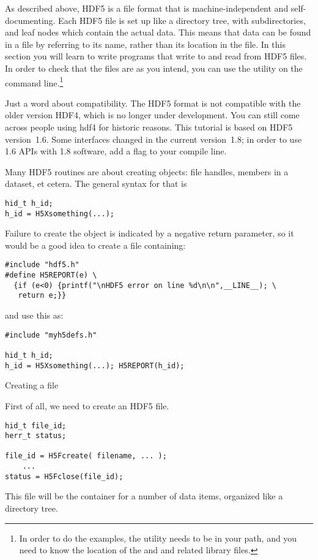 As described above, HDF5 is a file format that is machine-independent
and self-documenting. Each HDF5 file is set up like a directory tree,
with subdirectories, and leaf nodes which contain the actual
data. This means that data can be found in a file by referring to its
name, rather than its location in the file. In this section you will
learn to write programs that write to and read from HDF5 files. In
order to check that the files are as you intend, you can use the
 utility on the command line.\footnote{In order to do the
  examples, the  utility needs to be in your path, and you
  need to know the location of the  and  and
  related library files.}

Just a word about compatibility. The HDF5 format is not compatible
with the older version HDF4, which is no longer under development. You
can still come across people using hdf4 for historic reasons. This
tutorial is based on HDF5 version~1.6. Some interfaces changed in the
current version~1.8; in order to use 1.6 APIs with 1.8 software, add a
flag  to your compile line.

Many HDF5 routines are about creating objects: file handles, members
in a dataset, et cetera. The general syntax for that is
\begin{verbatim}
hid_t h_id;
h_id = H5Xsomething(...);
\end{verbatim}
Failure to create the object is indicated by a negative return
parameter, so it would be a good idea to create a file
  containing:
\begin{verbatim}
#include "hdf5.h"
#define H5REPORT(e) \
  {if (e<0) {printf("\nHDF5 error on line %d\n\n",__LINE__); \
   return e;}}
\end{verbatim}
and use this as:
\begin{verbatim}
#include "myh5defs.h"

hid_t h_id;
h_id = H5Xsomething(...); H5REPORT(h_id);
\end{verbatim}

 {Creating a file}

First of all, we need to create an HDF5 file.
\begin{verbatim}
hid_t file_id;
herr_t status;

file_id = H5Fcreate( filename, ... );
    ...
status = H5Fclose(file_id); 
\end{verbatim}
This file will be the container for a number of data items, organized
like a directory tree.

